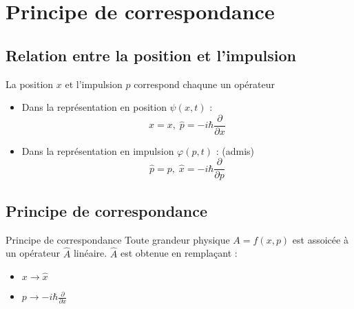 














\section{Principe de correspondance} %
\label{sec:Principe de correspondance}

\subsection{Relation entre la position et l'impulsion} %

La position $x$ et l'impulsion $p$ correspond chaqune un opérateur 
\begin{itemize}

    \item Dans la représentation en position $\psi(x,t)$ : 
      \begin{equation}
        \hat{x} = x, \; \hat{p} = - i \hbar \frac{\partial }{\partial x} 
      \end{equation}

    \item Dans la représentation en impulsion $\varphi(p,t)$ : (admis) 
      \begin{equation}
        \hat{p} = p, \; \hat{x} = - i \hbar \frac{\partial }{\partial p} 
      \end{equation}

\end{itemize}

\subsection{Principe de correspondance} %
\label{sub:Principe de correspondance}

\begin{Theorem}{Principe de correspondance}{}
Toute grandeur physique $A = f(x,p)$ est assoicée à un opérateur $\hat{A}$ linéaire. $\hat{A}$ est obtenue en remplaçant : 
\begin{itemize}

    \item $x \to \hat{x}$ 
    \item $p \to -i \hbar \frac{\partial }{\partial x} $

\end{itemize}
\end{Theorem}



